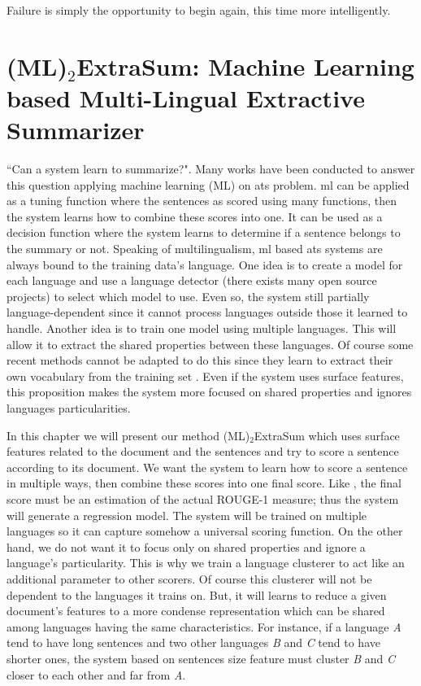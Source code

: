 \begin{savequote}[75mm] 
	Failure is simply the opportunity to begin again, this time more intelligently.
\end{savequote}

\chapter[(ML)$_\text{2}$ExtraSum: ML based Multi-Lingual Extractive Summarizer]{(ML)$_\text{2}$ExtraSum: Machine Learning based Multi-Lingual Extractive Summarizer}

``Can a system learn to summarize?". 
Many works have been conducted to answer this question applying machine learning (ML) on \ac{ats} problem.
\ac{ml} can be applied as a tuning function \citep{05-yeh-al,10-yatsko-al} where the sentences as scored using many functions, then the system learns how to combine these scores into one. 
It can be used as a decision function \citep{95-kupiec-al,02-osborne} where the system learns to determine if a  sentence belongs to the summary or not. 
Speaking of multilingualism, \ac{ml} based \ac{ats} systems are always bound to the training data's language. 
One idea is to create a model for each language and use a language detector (there exists many open source projects) to select which model to use. 
Even so, the system still partially language-dependent since it cannot process languages outside those it learned to handle. 
Another idea is to train one model using multiple languages. 
This will allow it to extract the shared properties between these languages. 
Of course some recent methods cannot be adapted to do this since they learn to extract their own vocabulary from the training set \citep{15-rush-al,16-nallapati-al,17-ling-rush,17-ren-al}.
Even if the system uses surface features, this proposition makes the system more focused on shared properties and ignores languages particularities.


In this chapter we will present our method (ML)$_\text{2}$ExtraSum which uses surface features related to the document and the sentences and try to score a sentence according to its document. 
We want the system to learn how to score a sentence in multiple ways, then combine these scores into one final score. 
Like \citet{17-ren-al}, the final score must be an estimation of the actual ROUGE-1 measure; thus the system will generate a regression model. 
The system will be trained on multiple languages so it can capture somehow a universal scoring function. 
On the other hand, we do not want it to focus only on shared properties and ignore a language's particularity. 
This is why we train a language clusterer to act like an additional parameter to other scorers. 
Of course this clusterer will not be dependent to the languages it trains on. 
But, it will learns to reduce a given document's features to a more condense representation which can be shared among languages having the same characteristics. 
For instance, if a language \textit{A} tend to have long sentences and two other languages \textit{B} and \textit{C} tend to have shorter ones, the system based on sentences size feature must cluster \textit{B} and \textit{C} closer to each other and far from \textit{A}. 


